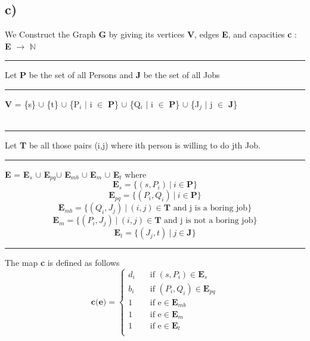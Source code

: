 \documentclass{report}
\begin{document}
 \subsection*{c)}
 We Construct the Graph \textbf{G} by giving its  vertices \textbf{V}, edges \textbf{E}, and capacities \textbf{c} : \textbf{E} $\rightarrow$ $\mathbb{N}$\\
 \rule[0.5cm]{2cm}{0pt} Let \textbf{P} be the set of all Persons and \textbf{J} be the set of all Jobs\\
 \rule[0.5mm]{2cm}{0pt} \textbf{V} = \{s\} $\cup$ \{t\} $\cup$ \{P$_i$ $|$ i $\in$ \textbf{P}\} $\cup$ \{Q$_i$ $|$ i $\in$ \textbf{P}\} $\cup$ \{J$_j$ $|$ j $\in$ \textbf{J}\} \\
 \vspace*{0em}\\
 \rule[0.5mm]{2cm}{0pt} Let \textbf{T} be all those pairs (i,j) where ith person is willing to do jth Job.\\
 \rule[0.5mm]{2cm}{0pt} \textbf{E} = \textbf{E$_{s}$} $\cup$ \textbf{E$_{pq}$}$\cup$ \textbf{E$_{mb}$} $\cup$ \textbf{E$_{m}$} $\cup$  \textbf{E$_{t}$} where\\
 \begin{equation*}
     \mathbf{E}_s = \{(s,P_i)\  |\  i \in \mathbf{P}\} 
 \end{equation*}
 \begin{equation*}
     \mathbf{E}_{pq} = \{(P_i,Q_i)\  | \ i \in \mathbf{P} \}
 \end{equation*}
 \begin{equation*}
     \mathbf{E}_{mb} = \{(Q_i,J_j)\  | \ (i,j) \in \mathbf{T} \text{ and j is a boring job} \}
 \end{equation*}
 \begin{equation*}
     \mathbf{E}_m = \{(P_i,J_j)\  | \ (i,j) \in \mathbf{T} \text{ and j is not a boring job} \}
 \end{equation*}
 \begin{equation*}
     \mathbf{E}_t = \{(J_j,t)\ |\  j \in \mathbf{J}\}
 \end{equation*}
  \rule[0.5mm]{2cm}{0pt} The map \textbf{c} is defined as follows \\
   \[   
    \textbf{c(e)} = 
         \begin{cases}
           d_i &\quad\text{if }(s,P_i) \in \mathbf{E}_s\\
           b_i &\quad\text{if }(P_i,Q_i) \in \mathbf{E}_{pq}\\
           1 &\quad\text{if e} \in \mathbf{E}_{mb}\\
           1 &\quad\text{if e} \in \mathbf{E}_m\\
           1 &\quad\text{if e} \in \mathbf{E}_t\\
         \end{cases}
    \]
\end{document}
